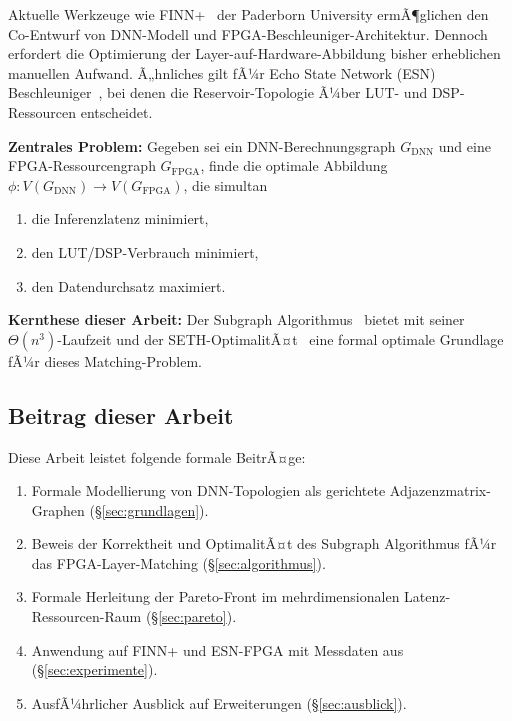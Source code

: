 ﻿\documentclass[a4paper,12pt]{article}
\theoremstyle{definition}
\begin{document}
Aktuelle Werkzeuge wie FINN+~\cite{jentzsch2025} der Paderborn University ermÃ¶glichen
den Co-Entwurf von DNN-Modell und FPGA-Beschleuniger-Architektur.
Dennoch erfordert die Optimierung der Layer-auf-Hardware-Abbildung bisher erheblichen
manuellen Aufwand. Ã„hnliches gilt fÃ¼r Echo State Network (ESN) Beschleuniger~\cite{jafari2025},
bei denen die Reservoir-Topologie Ã¼ber LUT- und DSP-Ressourcen entscheidet.

\textbf{Zentrales Problem:} Gegeben sei ein DNN-Berechnungsgraph $G_{\text{DNN}}$
und eine FPGA-Ressourcengraph $G_{\text{FPGA}}$, finde die optimale Abbildung
$\phi: V(G_{\text{DNN}}) \to V(G_{\text{FPGA}})$, die simultan
\begin{enumerate}
    \item die Inferenzlatenz minimiert,
    \item den LUT/DSP-Verbrauch minimiert,
    \item den Datendurchsatz maximiert.
\end{enumerate}

\textbf{Kernthese dieser Arbeit:} Der Subgraph Algorithmus~\cite{epp2026a} bietet mit
seiner $\Theta(n^3)$-Laufzeit und der SETH-OptimalitÃ¤t~\cite{epp2026b} eine formal
optimale Grundlage fÃ¼r dieses Matching-Problem.

\subsection{Beitrag dieser Arbeit}

Diese Arbeit leistet folgende formale BeitrÃ¤ge:
\begin{enumerate}
    \item Formale Modellierung von DNN-Topologien als gerichtete Adjazenzmatrix-Graphen
          (\S\ref{sec:grundlagen}).
    \item Beweis der Korrektheit und OptimalitÃ¤t des Subgraph Algorithmus fÃ¼r das
          FPGA-Layer-Matching (\S\ref{sec:algorithmus}).
    \item Formale Herleitung der Pareto-Front im mehrdimensionalen
          Latenz-Ressourcen-Raum (\S\ref{sec:pareto}).
    \item Anwendung auf FINN+ und ESN-FPGA mit Messdaten aus~\cite{jentzsch2025, jafari2025}
          (\S\ref{sec:experimente}).
    \item AusfÃ¼hrlicher Ausblick auf Erweiterungen (\S\ref{sec:ausblick}).
\end{enumerate}

\end{document}
